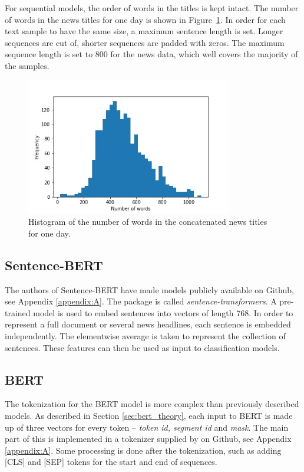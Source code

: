 For sequential models, the order of words in the titles is kept intact. The number of words in the news titles for one day is shown in Figure~\ref{fig:num_words}. In order for each text sample to have the same size, a maximum sentence length is set. Longer sequences are cut of, shorter sequences are padded with zeros. The maximum sequence length is set to 800 for the news data, which well covers the majority of the samples. 

\begin{figure}[H]
\centering
\includegraphics[width=0.8\textwidth]{Figures/wordcount.jpg}
\caption{Histogram of the number of words in the concatenated news titles for one day. }
\label{fig:num_words}
\end{figure}

\subsection{Sentence-BERT}

The authors of Sentence-BERT \citeauthor{reimers2019sentence} have made models publicly available on Github, see Appendix \ref{appendix:A}. The package is called \emph{sentence-transformers}. A pre-trained model is used to embed sentences into vectors of length 768. In order to represent a full document or several news headlines, each sentence is embedded independently. The elementwise average is taken to represent the collection of sentences. These features can then be used as input to classification models. 

\subsection{BERT}

The tokenization for the BERT model is more complex than previously described models. As described in Section \ref{sec:bert_theory}, each input to BERT is made up of three vectors for every token -- \emph{token id, segment id} and \emph{mask}. The main part of this is implemented in a tokenizer supplied by \citet{devlin2018bert} on Github, see Appendix \ref{appendix:A}. Some processing is done after the tokenization, such as adding \textsc{[CLS]} and \textsc{[SEP]} tokens for the start and end of sequences. 

